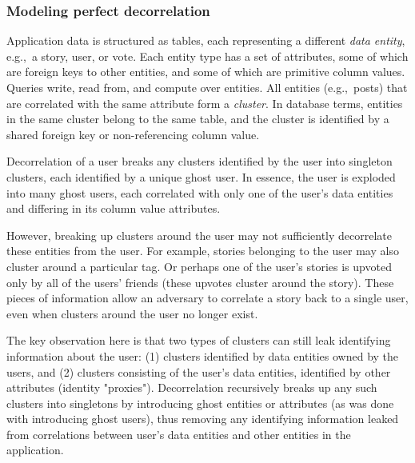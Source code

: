 \iffalse
\subsubsection{Modeling perfect decorrelation}
Application data is structured as tables, each representing a different \emph{data entity}, e.g.,\ a
story, user, or vote. Each entity type has a set of attributes, some of which are foreign keys to
other entities, and some of which are primitive column values.
Queries write, read from, and compute over entities.  All entities (e.g.,\
posts) that are correlated with the same attribute form a \emph{cluster}.
In database terms, entities in the same cluster belong to the same table, and the cluster is
identified by a shared foreign key or non-referencing column value.

Decorrelation of a user breaks any clusters identified by the user into singleton clusters, each
identified by a unique ghost user. In essence, the user is exploded into many ghost users, each
correlated with only one of the user's data entities and differing in its column
value attributes.

However, breaking up clusters around the user may not sufficiently decorrelate these entities from
the user. For example, stories belonging to the user may also cluster around a particular tag. Or
perhaps one of the user's stories is upvoted only by all of the users' friends (these upvotes
cluster around the story). These pieces of information allow an adversary to correlate a story back
to a single user, even when clusters around the user no longer exist.

The key observation here is that two types of clusters can still leak identifying information about
the user: (1) clusters identified by data entities owned by the users, and (2) clusters consisting
of the user's data entities, identified by other attributes (identity "proxies"). Decorrelation
recursively breaks up any such clusters into singletons by introducing ghost entities or attributes
(as was done with introducing ghost users), thus removing any identifying information leaked from
correlations between user's data entities and other entities in the application.

